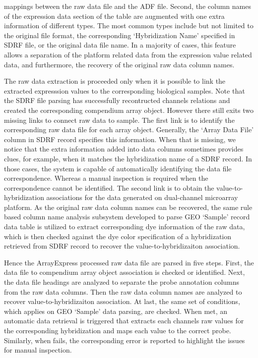 mappings between the raw data file and the ADF file.
%
Second, the column names of the expression data section of the table are
augmented with one extra information of different types.  The most common
types include but not limited to the original file format, the corresponding
`Hybridization Name' specified in SDRF file, or the original data file name.
%
In a majority of cases, this feature allows a separation of the platform
related data from the expression value related data, and furthermore, the
recovery of the original raw data column names.
%

The raw data extraction is proceeded only when it is possible to link the
extracted expresssion values to the corresponding biological samples.
%
Note that the SDRF file parsing has successfully recontructed channels
relations and created the corresponding compendium array object.
%
However there still exits two missing links to connect raw data to sample.
%
The first link is to identify the corresponding raw data file for each array
object.  Generally, the `Array Data File' column in SDRF record specifies
this information.
%
When that is missing, we notice that the extra information added into
data columns sometimes provides clues, for example, when it matches the
hybridization name of a SDRF record.
%
In those cases, the system is capable of automatically identifying the data
file correspondence.
%
Whereas a manual inspection is required when the correspondence cannot be
identified.
%
The second link is to obtain the value-to-hybridization associations for the
data generated on dual-channel microarray platform.
%
As the original raw data column names can be recovered, the same rule
based column name analysis subsystem developed to parse GEO `Sample'
record data table is utilized to extract corresponding dye information of
the raw data, which is then checked against the dye color specification
of a hybridization retrieved from SDRF record to recover the
value-to-hybridizaiton association.

Hence the ArrayExpress processed raw data file are parsed in five steps.
%
First, the data file to compendium array object association is checked or
identified.  Next, the data file headings are analyzed to separate the
probe annotation columns from the raw data columns.  Then the raw data
column names are analyzed to recover value-to-hybridizaiton association.
At last, the same set of conditions, which applies on GEO `Sample' data
parsing, are checked.  When met, an automatic data retrieval is triggered
that extracts each channels raw values for the corresponding
hybridization and maps each value to the correct probe.
%
Similarly, when fails, the corresponding error is reported to highlight
the issues for manual inspection.


